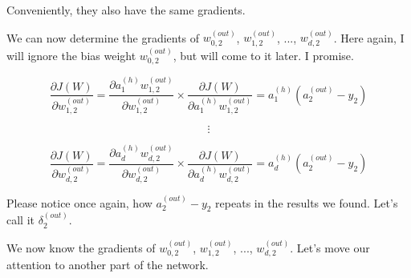 \documentclass[../main.tex]{subfiles}
\begin{document}
\vspace{5mm} %

Conveniently, they also have the same gradients.

\vspace{5mm} %

We can now determine the gradients of $w_{0,2}^{(out)}$, $w_{1,2}^{(out)}$, ..., $w_{d,2}^{(out)}$.
Here again, I will ignore the bias weight $w_{0,2}^{(out)}$, but will come to it later. I promise.

\[
    \frac{\partial J(W)}{\partial w_{1,2}^{(out)}} =
    \frac{\partial a_1^{(h)}w_{1,2}^{(out)}}{\partial w_{1,2}^{(out)}} \times
    \frac{\partial J(W)}{\partial a_1^{(h)}w_{1,2}^{(out)}}  =
    a_1^{(h)}(a_{2}^{(out)} - y_{2})
\]

\[ \vdots \]

\[
    \frac{\partial J(W)}{\partial w_{d,2}^{(out)}} =
    \frac{\partial a_d^{(h)}w_{d,2}^{(out)}}{\partial w_{d,2}^{(out)}} \times
    \frac{\partial J(W)}{\partial a_d^{(h)}w_{d,2}^{(out)}}  =
    a_d^{(h)}(a_{2}^{(out)} - y_{2})
\]

\vspace{1cm} %

Please notice once again, how $a_{2}^{(out)} - y_{2}$ repeats in the results
we found. Let's call it $\delta_2^{(out)}$.

\vspace{1cm} %

We now know the gradients of $w_{0,2}^{(out)}$, $w_{1,2}^{(out)}$, ..., $w_{d,2}^{(out)}$.
Let's move our attention to another part of the network.
\end{document}
